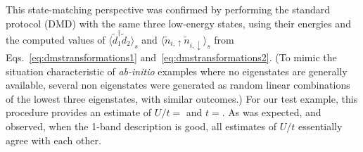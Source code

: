 This state-matching perspective was confirmed by performing the standard protocol (DMD) with the same three low-energy states, 
using their energies and the computed values of $\langle \tilde{d}_1^{\dagger} \tilde{d}_2 \rangle_s$ 
and $\langle \tilde{n}_{i,\uparrow} \tilde{n}_{i,\downarrow} \rangle_{s}$ from Eqs.~\eqref{eq:dmstransformations1} 
and~\eqref{eq:dmstransformations2}. 
(To mimic the situation characteristic of \textit{ab-initio} examples where no eigenstates are generally available, 
several non eigenstates were generated as random linear combinations of the lowest three eigenstates, with 
similar outcomes.) For our test example, this procedure provides an estimate of $U/t = $ and $t = $. 
As was expected, and observed, when the 1-band description is good, all estimates of $U/t$ 
essentially agree with each other. 

